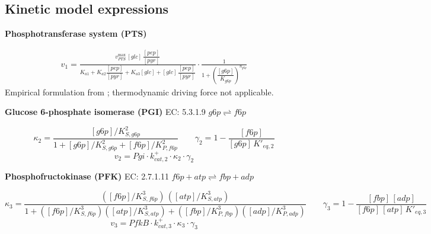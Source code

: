 \clearpage
\onecolumn
\supplementarysection
\subsection{Kinetic model expressions}\label{sec: kinetic expressions}



\textbf{Phosphotransferase system (PTS)}

\begin{align}
    v_1 =
    \frac{
        v^{\max}_{PTS}\,[glc]\,\dfrac{[pep]}{[pyr]}
    }{
        K_{a1} + K_{a2}\dfrac{[pep]}{[pyr]}
        + K_{a3}[glc]
        + [glc]\,\dfrac{[pep]}{[pyr]}
    }
    \cdot
    \frac{1}{1 + \left(\dfrac{[g6p]}{K_{g6p}}\right)^{n_{g6p}}}
    \label{eqn: PTS}
\end{align}
Empirical formulation from \textcite{Kadir2010ModelingsimulationmainmetabolismEscherichiacoliitsseveralsinglegeneknockoutmutantsexperimentalverification}; thermodynamic driving force not applicable.

\textbf{Glucose 6-phosphate isomerase (PGI)} \quad EC: 5.3.1.9 \quad $g6p \rightleftharpoons f6p$

\begin{equation}
    \kappa_2 = \frac{[g6p]/K_{S,g6p}^2}%
                    {1 + [g6p]/K_{S,g6p}^2 + [f6p]/K_{P,f6p}^2}
    \qquad
    \gamma_2 = 1 - \frac{[f6p]}{[g6p]\,K'_{eq,2}}
\end{equation}
\begin{equation}
    v_2 = Pgi \cdot k^+_{cat,2} \cdot \kappa_2 \cdot \gamma_2
    \label{eqn: pgi}
\end{equation}

\textbf{Phosphofructokinase (PFK)} \quad EC: 2.7.1.11 \quad $f6p + atp \rightleftharpoons fbp + adp$

\begin{equation}
    \kappa_3 = \frac{([f6p]/K_{S,f6p}^3)\,([atp]/K_{S,atp}^3)}%
                    {1 + ([f6p]/K_{S,f6p}^3)([atp]/K_{S,atp}^3) + ([fbp]/K_{P,fbp}^3)([adp]/K_{P,adp}^3)}
    \qquad
    \gamma_3 = 1 - \frac{[fbp]\,[adp]}{[f6p]\,[atp]\,K'_{eq,3}}
\end{equation}
\begin{equation}
    v_3 = PfkB \cdot k^+_{cat,3} \cdot \kappa_3 \cdot \gamma_3
    \label{eqn: pfk}
\end{equation}

